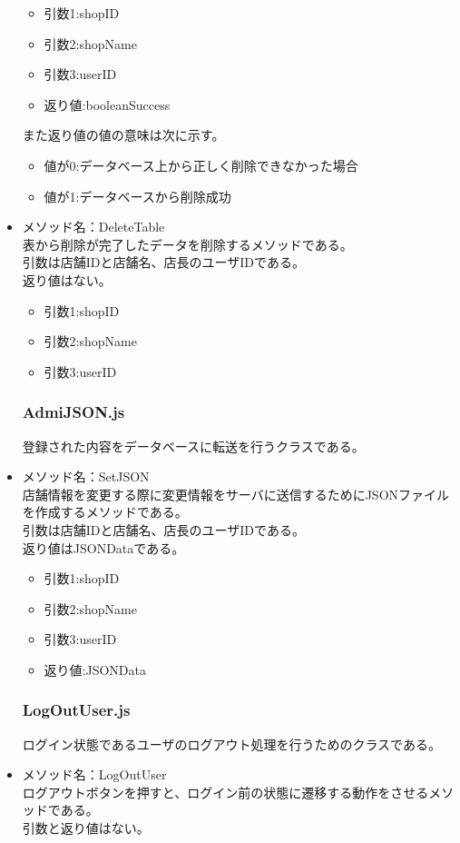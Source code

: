 \documentclass[a4j]{jarticle}
\begin{document}
\begin{itemize}
	\begin{itemize}
		\item 引数1:shopID
		\item 引数2:shopName
		\item 引数3:userID
		\item 返り値:booleanSuccess
	\end{itemize}
また返り値の値の意味は次に示す。
	\begin{itemize}
		\item 値が0:データベース上から正しく削除できなかった場合
		\item 値が1:データベースから削除成功
	\end{itemize}

\item メソッド名：DeleteTable\\

表から削除が完了したデータを削除するメソッドである。\\
引数は店舗IDと店舗名、店長のユーザIDである。\\
返り値はない。
	\begin{itemize}
		\item 引数1:shopID
		\item 引数2:shopName
		\item 引数3:userID
	\end{itemize}
\subsubsection{AdmiJSON.js}
登録された内容をデータベースに転送を行うクラスである。

\item メソッド名：SetJSON\\

店舗情報を変更する際に変更情報をサーバに送信するためにJSONファイルを作成するメソッドである。\\
引数は店舗IDと店舗名、店長のユーザIDである。\\
返り値はJSONDataである。
	\begin{itemize}
		\item 引数1:shopID
		\item 引数2:shopName
		\item 引数3:userID
		\item 返り値:JSONData
	\end{itemize}
\subsubsection{LogOutUser.js}
ログイン状態であるユーザのログアウト処理を行うためのクラスである。
%
\item メソッド名：LogOutUser\\
ログアウトボタンを押すと、ログイン前の状態に遷移する動作をさせるメソッドである。\\
引数と返り値はない。
%

\end{itemize}
\end{document}
